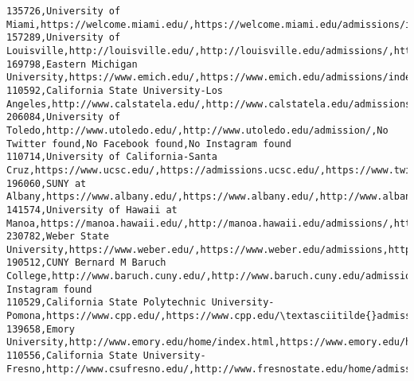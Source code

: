 \documentclass[11pt]{article}
\begin{document}
\begin{Verbatim}[commandchars=\\\{\}]
135726,University of Miami,https://welcome.miami.edu/,https://welcome.miami.edu/admissions/index.html,https://twitter.com/univmiami,https://www.facebook.com/events/516937869134636/,https://instagram.com/univmiami
157289,University of Louisville,http://louisville.edu/,http://louisville.edu/admissions/,https://twitter.com/uofl,https://www.facebook.com/UniversityofLouisville/,https://www.instagram.com/universityoflouisville
169798,Eastern Michigan University,https://www.emich.edu/,https://www.emich.edu/admissions/index.php,https://twitter.com/EasternMichU/,https://www.facebook.com/EasternMichU/,https://www.instagram.com/easternmichigan/
110592,California State University-Los Angeles,http://www.calstatela.edu/,http://www.calstatela.edu/admissions,https://twitter.com/calstatela,https://www.facebook.com/CalStateLA,http://instagram.com/calstatela
206084,University of Toledo,http://www.utoledo.edu/,http://www.utoledo.edu/admission/,No Twitter found,No Facebook found,No Instagram found
110714,University of California-Santa Cruz,https://www.ucsc.edu/,https://admissions.ucsc.edu/,https://www.twitter.com/ucsc,https://www.facebook.com/ucsantacruz,https://instagram.com/ucsc
196060,SUNY at Albany,https://www.albany.edu/,https://www.albany.edu/,http://www.albany.edu/main/twitter.shtml,http://www.albany.edu/main/facebook.shtml,http://www.albany.edu/main/instagram.shtml
141574,University of Hawaii at Manoa,https://manoa.hawaii.edu/,http://manoa.hawaii.edu/admissions/,https://twitter.com/UHManoa,https://www.facebook.com/uhmanoa,https://instagram.com/uhmanoanews
230782,Weber State University,https://www.weber.edu/,https://www.weber.edu/admissions,https://twitter.com/WeberStateU,https://www.facebook.com/WeberState,https://instagram.com/weberstate
190512,CUNY Bernard M Baruch College,http://www.baruch.cuny.edu/,http://www.baruch.cuny.edu/admission/,http://www.twitter.com/baruchcollege,http://www.facebook.com/baruchcollege,No Instagram found
110529,California State Polytechnic University-Pomona,https://www.cpp.edu/,https://www.cpp.edu/\textasciitilde{}admissions/,https://twitter.com/cpp\_admissions,https://www.facebook.com/cppadmissions,https://www.instagram.com/cpp\_admissions/
139658,Emory University,http://www.emory.edu/home/index.html,https://www.emory.edu/home/admission/index.html,http://twitter.com/emoryuniversity,http://www.facebook.com/EmoryUniversity,http://instagram.com/emoryuniversity
110556,California State University-Fresno,http://www.csufresno.edu/,http://www.fresnostate.edu/home/admissions/index.html,http://twitter.com/Fresno\_State,http://www.facebook.com/fresnostate,http://instagram.com/fresno\_state

\end{Verbatim}
\end{document}
